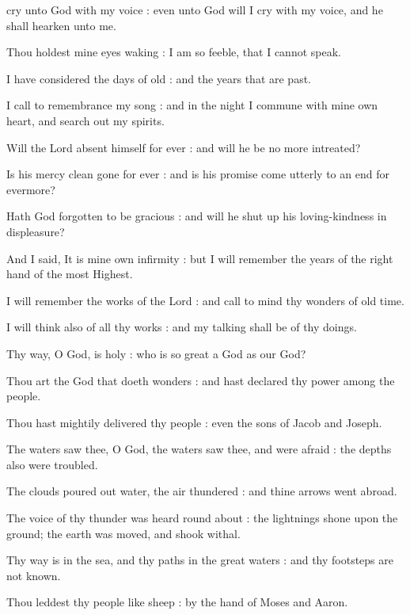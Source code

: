  cry unto God with my voice : even unto God will I cry with my voice, and he shall hearken unto me.\par
{}
Thou holdest mine eyes waking : I am so feeble, that I cannot speak.\par
{}I have considered the days of old : and the years that are past.\par
{}I call to remembrance my song : and in the night I commune with mine own heart, and search out my spirits.\par
{}Will the Lord absent himself for ever : and will he be no more intreated?\par
{}Is his mercy clean gone for ever : and is his promise come utterly to an end for evermore?\par
{}Hath God forgotten to be gracious : and will he shut up his loving-kindness in displeasure?\par
{}And I said, It is mine own infirmity : but I will remember the years of the right hand of the most Highest.\par
{}I will remember the works of the Lord : and call to mind thy wonders of old time.\par
{}I will think also of all thy works : and my talking shall be of thy doings.\par
{}Thy way, O God, is holy : who is so great a God as our God?\par
{}Thou art the God that doeth wonders : and hast declared thy power among the people.\par
{}Thou hast mightily delivered thy people : even the sons of Jacob and Joseph.\par
{}The waters saw thee, O God, the waters saw thee, and were afraid : the depths also were troubled.\par
{}The clouds poured out water, the air thundered : and thine arrows went abroad.\par
{}The voice of thy thunder was heard round about : the lightnings shone upon the ground; the earth was moved, and shook withal.\par
{}Thy way is in the sea, and thy paths in the great waters : and thy footsteps are not known.\par
{}Thou leddest thy people like sheep : by the hand of Moses and Aaron.\par

